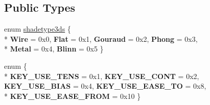 \subsection*{Public Types}
\begin{DoxyCompactItemize}
\item 
enum \hyperlink{class_assimp_1_1_d3_d_s_1_1_discreet3_d_s_aea20f1be654c4f3655b9b6e55518e237}{shadetype3ds} \{ \\*
{\bfseries Wire} = 0x0, 
{\bfseries Flat} = 0x1, 
{\bfseries Gouraud} = 0x2, 
{\bfseries Phong} = 0x3, 
\\*
{\bfseries Metal} = 0x4, 
{\bfseries Blinn} = 0x5
 \}
\item 
\hypertarget{class_assimp_1_1_d3_d_s_1_1_discreet3_d_s_a715ae3e02d3e86c62ab7d82061caf156}{enum \{ \\*
{\bfseries K\+E\+Y\+\_\+\+U\+S\+E\+\_\+\+T\+E\+N\+S} = 0x1, 
{\bfseries K\+E\+Y\+\_\+\+U\+S\+E\+\_\+\+C\+O\+N\+T} = 0x2, 
{\bfseries K\+E\+Y\+\_\+\+U\+S\+E\+\_\+\+B\+I\+A\+S} = 0x4, 
{\bfseries K\+E\+Y\+\_\+\+U\+S\+E\+\_\+\+E\+A\+S\+E\+\_\+\+T\+O} = 0x8, 
\\*
{\bfseries K\+E\+Y\+\_\+\+U\+S\+E\+\_\+\+E\+A\+S\+E\+\_\+\+F\+R\+O\+M} = 0x10
 \}}\label{class_assimp_1_1_d3_d_s_1_1_discreet3_d_s_a715ae3e02d3e86c62ab7d82061caf156}


\end{DoxyCompactItemize}
